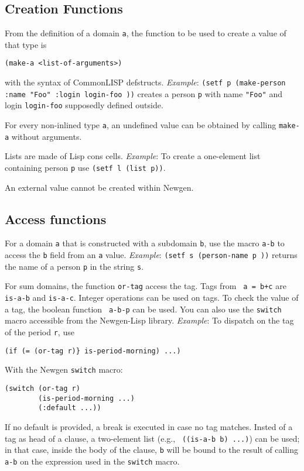 \subsection{Creation Functions}

From the definition of a domain {\tt a}, the function to be used to
create a value of that type is 
\begin{center}
{\tt (make-a <list-of-arguments>)}
\end{center}
with the syntax of CommonLISP defstructs.  {\em Example}: {\tt (setf p
(make-person :name "Foo" :login login-foo ))} creates a person {\tt p}
with name {\tt "Foo"} and login {\tt login-foo} supposedly defined
outside.

For every non-inlined type {\tt a}, an undefined value can be obtained
by calling {\tt make-a} without arguments.

Lists are made of Lisp cons cells. 
{\em Example}: To create a one-element list
containing person {\tt p} use {\tt (setf l (list p))}.

An external value cannot be created within Newgen.

\subsection{Access functions}

For a domain {\tt a} that is constructed with a subdomain {\tt b}, use
the macro {\tt a-b} to access the {\tt b} field from an {\tt a} value.
{\em Example}: {\tt (setf s (person-name p ))} returns the name of a
person {\tt p} in the string {\tt s}.

For sum domains, the function {\tt or-tag} access the tag. Tags from {\tt
a = b+c} are {\tt is-a-b} and {\tt is-a-c}. Integer operations can be
used on tags. To check the value of a tag, the boolean function {\tt
a-b-p} can be used. You can also use the {\tt switch} macro accessible
from the Newgen-Lisp library.
{\em Example}: To dispatch on the tag of the period {\tt r}, use
\begin{verbatim}
(if (= (or-tag r)} is-period-morning) ...)
\end{verbatim}
With the Newgen {\tt switch} macro:
\begin{verbatim}
(switch (or-tag r)
        (is-period-morning ...)
        (:default ...))
\end{verbatim}
If no default is provided, a break is executed in case no tag matches.
Insted of a tag as head of a clause, a two-element list (e.g., {\tt
((is-a-b b) ...)}) can be used; in that case, inside the body of the
clause, {\tt b} will be bound to the result of calling {\tt a-b} on the
expression used in the {\tt switch} macro.

